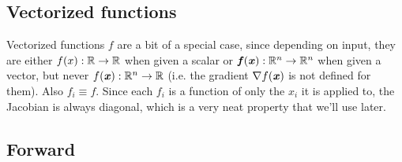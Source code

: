 \documentclass[paper=a4,11pt,headsepline]{scrartcl}
\begin{document}
\subsection{Vectorized \numpy functions}

Vectorized \numpy functions $f$ are a bit of a special case, since depending on
input, they are either $f(x):\mathbb R\rightarrow\mathbb R$ when given a scalar or $\bm{\mathit{f}}(\bm{\mathit{x}}):\mathbb R^n\rightarrow\mathbb R^n$ when given a vector, but never $f(\bm{\mathit{x}}):
\mathbb R^n \rightarrow \mathbb R$ (i.e. the gradient $\nabla f(\bm{\mathit{x}})$ is not defined
for them). Also $f_i\equiv f$. Since each $f_i$ is a function of only the $x_i$
it is applied to, the Jacobian is always diagonal, which is a very neat
property that we'll use later.

\subsection{Forward}
\end{document}
